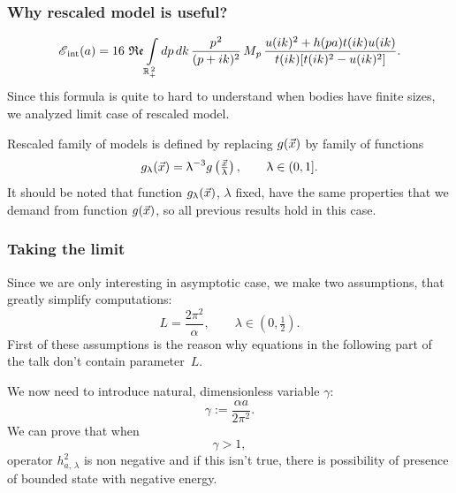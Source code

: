 \documentclass[10pt,t]{beamer}
\begin{document}
\begin{frame}
  \frametitle{Why rescaled model is useful?}

  \vspace{-2em}


  \begin{equation}
    \label{eq:Rescaled-version-of-the-model-01}
    \mathcal{E}_{ \, \textrm{int}}( a ) =
    16 \, \operatorname{\mathfrak{Re}} \int\limits_{ \mathbb{R}_{ + }^{ \, 2 } } dp \, dk \,
    \frac{ p^{ \hspace{0.05em} 2 } }{ ( p + i k )^{ 2 } } \, M_{ \hspace{0.05em} p } \,
    \frac{ u( i k )^{ 2 } + h( p a ) t( i k ) u( i k ) }{
      t( i k ) [ t( i k )^{ 2 } - u( i k )^{ 2 } ] }.
  \end{equation}
  Since this formula is quite to hard to understand when bodies have finite
  sizes, we analyzed limit case of rescaled model.

  Rescaled family of models is defined by replacing $g( \vec{x} )$ by family
  of functions
  \begin{equation}
    \label{eq:Rescaled-version-of-the-model-02}
    g_{ \uplambda }( \vec{x} ) =
    \uplambda^{ -3 } g\left( \tfrac{ \vec{x} }{ \uplambda } \right), \qquad
    \uplambda \in ( 0, 1 ].
  \end{equation}
  It should be noted that function $g_{ \uplambda }( \vec{x} )$, $\lambda$ fixed, have the
  same properties that we demand from function $g( \vec{x} )$, so all
  previous results hold in this case.

\end{frame}





\begin{frame}
  \frametitle{Taking the limit}


  Since we are only interesting in asymptotic case, we make two assumptions,
  that greatly simplify computations:
  \begin{equation}
    \label{eq:Rescaled-version-of-the-model-03}
    L = \frac{ 2 \pi^{ 2 } }{ \alpha }, \qquad
    \lambda \in \left( 0, \tfrac{ 1 }{ 2 } \right).
  \end{equation}
  First of these assumptions is the reason why equations in the following
  part of the talk \alert{don't} contain parameter~$L$.

  We now need to introduce natural, dimensionless variable $\gamma$:
  \begin{equation}
    \label{eq:Rescaled-version-of-the-model-04}
    \gamma := \frac{ \alpha a }{ 2 \pi^{ 2 } }.
  \end{equation}
  We can prove that when
  \begin{equation}
    \label{eq:Rescaled-version-of-the-model-05}
    \gamma > 1,
  \end{equation}
  operator $h_{ a, \, \lambda }^{ 2 }$ is non negative and if this isn't true,
  there is \alert{possibility} of presence of bounded state with
  negative energy.

\end{frame}
\end{document}
